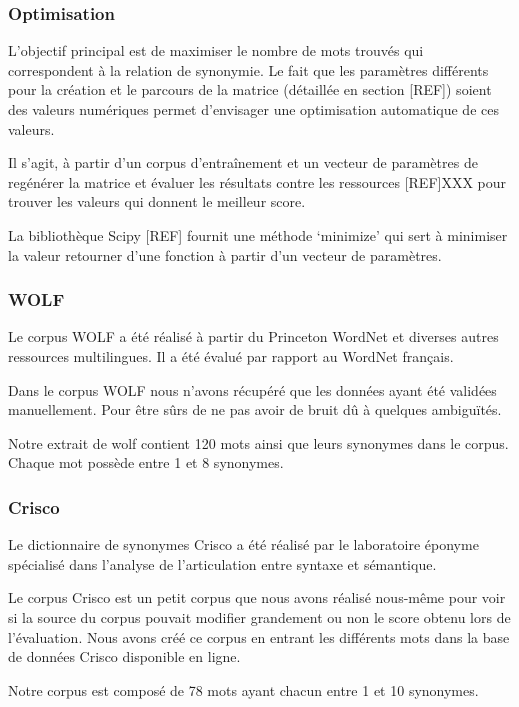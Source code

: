 \subsubsection{Optimisation}

L'objectif principal est de maximiser le nombre de mots trouvés qui 
correspondent à la relation de synonymie. Le fait que les paramètres différents 
pour la création et le parcours de la matrice (détaillée en section [REF]) 
soient des valeurs numériques permet d'envisager une optimisation automatique de 
ces valeurs.

Il s'agit, à partir d'un corpus d'entraînement et un vecteur de paramètres de 
regénérer la matrice et évaluer les résultats contre les ressources [REF]XXX 
pour trouver les valeurs qui donnent le meilleur score.

La bibliothèque Scipy [REF] fournit une méthode \lq{minimize}\rq{} qui sert à 
minimiser la valeur retourner d'une fonction à partir d'un vecteur de 
paramètres.

\subsubsection{WOLF}

Le corpus WOLF a été réalisé à partir du Princeton WordNet et diverses autres 
ressources multilingues. Il a été évalué par rapport au WordNet français.

Dans le corpus WOLF nous n'avons récupéré que les données ayant été validées 
manuellement. Pour être sûrs de ne pas avoir de bruit dû à quelques ambiguïtés.

Notre extrait de wolf contient 120 mots ainsi que leurs synonymes dans le 
corpus. Chaque mot possède entre 1 et 8 synonymes.

\subsubsection{Crisco}

Le dictionnaire de synonymes Crisco a été réalisé par le laboratoire éponyme 
spécialisé dans l’analyse de l’articulation entre syntaxe et sémantique.

Le corpus Crisco est un petit corpus que nous avons réalisé nous-même pour voir 
si la source du corpus pouvait modifier grandement ou non le score obtenu lors 
de l'évaluation. Nous avons créé ce corpus en entrant les différents mots dans 
la base de données Crisco disponible en ligne.

Notre corpus est composé de 78 mots ayant chacun entre 1 et 10 synonymes.


